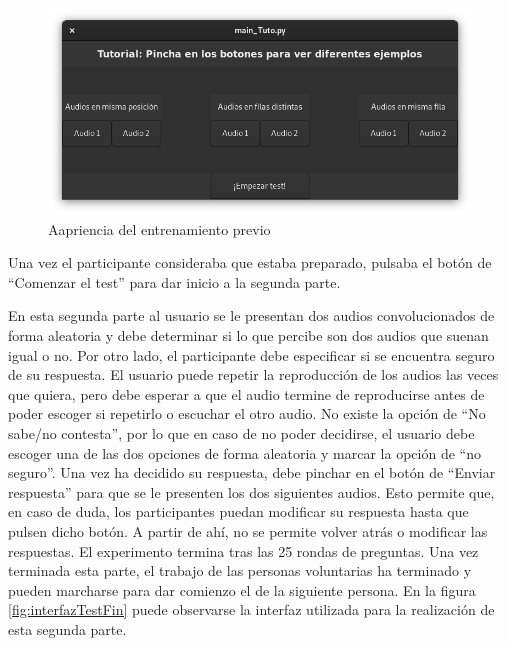 \documentclass[11pt,a4paper,twoside]{book}
\begin{document}
                    \begin{figure}[H]
                        \includegraphics[scale=0.6]{../imagenes/interfaz_tutorial.png}
			            \centering
			            \caption{Aapriencia del entrenamiento previo}
			            \label{fig:interfazTutorial}
                    \end{figure}
                
                    Una vez el participante consideraba que estaba preparado, pulsaba el botón de ``Comenzar el test'' para dar inicio a la segunda parte.
                
                    En esta segunda parte al usuario se le presentan dos audios convolucionados de forma aleatoria y debe determinar si lo que percibe son dos audios que suenan igual o no. Por otro lado, el participante debe especificar si se encuentra seguro de su respuesta. El usuario puede repetir la reproducción de los audios las veces que quiera, pero debe esperar a que el audio termine de reproducirse antes de poder escoger si repetirlo o escuchar el otro audio. No existe la opción de ``No sabe/no contesta'', por lo que en caso de no poder decidirse, el usuario debe escoger una de las dos opciones de forma aleatoria y marcar la opción de ``no seguro''. Una vez ha decidido su respuesta, debe pinchar en el botón de ``Enviar respuesta'' para que se le presenten los dos siguientes audios. Esto permite que, en caso de duda, los participantes puedan modificar su respuesta hasta que pulsen dicho botón. A partir de ahí, no se permite volver atrás o modificar las respuestas. El experimento termina tras las 25 rondas de preguntas. Una vez terminada esta parte, el trabajo de las personas voluntarias ha terminado y pueden marcharse para dar comienzo el de la siguiente persona. En la figura \ref{fig:interfazTestFin} puede observarse la interfaz utilizada para la realización de esta segunda parte.
                
\end{document}
